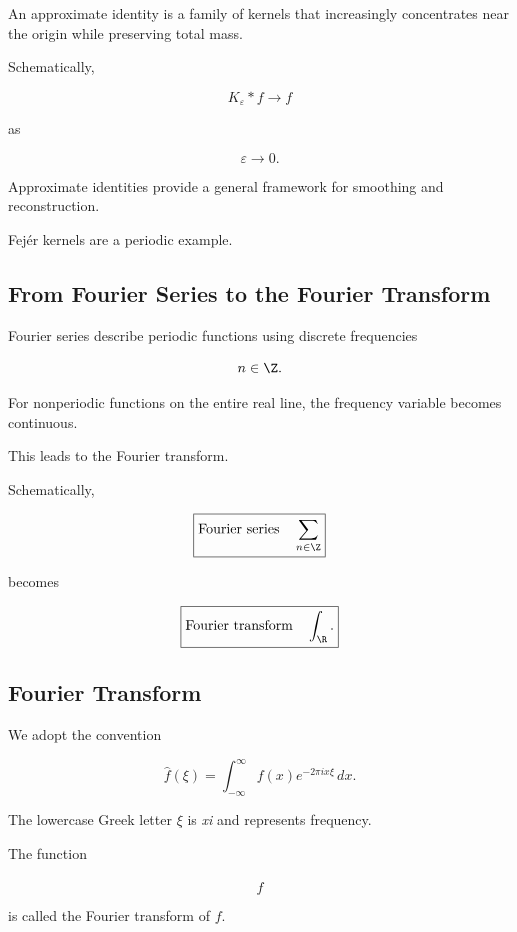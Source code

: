 An approximate identity is a family of kernels that increasingly
concentrates near the origin while preserving total mass.

Schematically,

\[
\boxed{
K_\varepsilon*f
\longrightarrow
f
}
\]

as

\[
\varepsilon\to0.
\]

Approximate identities provide a general framework for smoothing and
reconstruction.

Fej\'er kernels are a periodic example.

\subsection{From Fourier Series to the Fourier Transform}
\label{subsec:series-to-transform}

Fourier series describe periodic functions using discrete frequencies

\[
n\in\Z.
\]

For nonperiodic functions on the entire real line, the frequency variable
becomes continuous.

This leads to the Fourier transform.

Schematically,

\[
\boxed{
\text{Fourier series}
\quad
\sum_{n\in\Z}
}
\]

becomes

\[
\boxed{
\text{Fourier transform}
\quad
\int_{\R}.
}
\]

\subsection{Fourier Transform}
\label{subsec:fourier-transform}

We adopt the convention

\[
\boxed{
\widehat{f}(\xi)
=
\int_{-\infty}^{\infty}
f(x)e^{-2\pi i x\xi}\,dx.
}
\]

The lowercase Greek letter \(\xi\) is \emph{xi} and represents frequency.

The function

\[
\widehat{f}
\]

is called the Fourier transform of \(f\).

